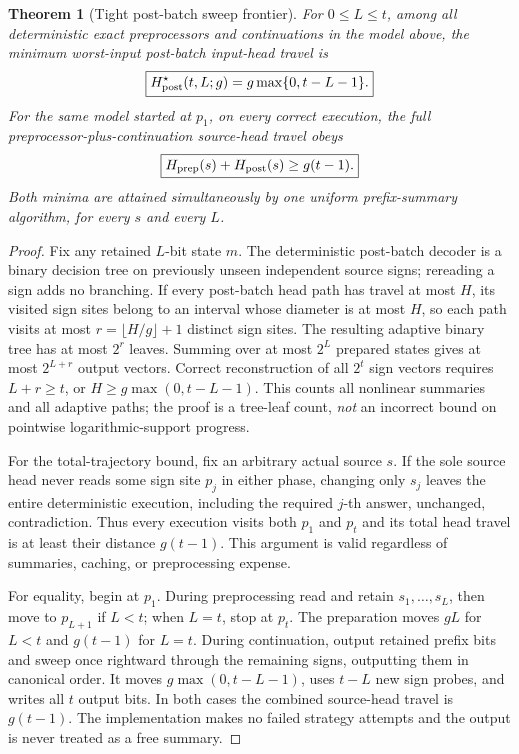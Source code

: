 \documentclass[10pt]{article}
\newtheorem{theorem}{Theorem}
\begin{document}
\begin{theorem}[Tight post-batch sweep frontier]\label{thm:sweep}
For $0\le L\le t$, among all deterministic exact preprocessors and continuations in the model above, the minimum worst-input post-batch input-head travel is
\[\boxed{H_{\rm post}^{\star}(t,L;g)=g\max\{0,t-L-1\}.}\]
For the same model started at $p_1$, on \emph{every} correct execution, the full preprocessor-plus-continuation source-head travel obeys
\[\boxed{H_{\rm prep}(s)+H_{\rm post}(s)\ge g(t-1).}\]
Both minima are attained simultaneously by one uniform prefix-summary algorithm, for every $s$ and every $L$.
\end{theorem}
\begin{proof}
Fix any retained $L$-bit state $m$. The deterministic post-batch decoder is a binary decision tree on previously unseen independent source signs; rereading a sign adds no branching. If every post-batch head path has travel at most $H$, its visited sign sites belong to an interval whose diameter is at most $H$, so each path visits at most $r=\lfloor H/g\rfloor+1$ distinct sign sites. The resulting adaptive binary tree has at most $2^r$ leaves. Summing over at most $2^L$ prepared states gives at most $2^{L+r}$ output vectors. Correct reconstruction of all $2^t$ sign vectors requires $L+r\ge t$, or $H\ge g\max(0,t-L-1)$. This counts all nonlinear summaries and all adaptive paths; the proof is a tree-leaf count, \emph{not} an incorrect bound on pointwise logarithmic-support progress.

For the total-trajectory bound, fix an arbitrary actual source $s$. If the sole source head never reads some sign site $p_j$ in either phase, changing only $s_j$ leaves the entire deterministic execution, including the required $j$-th answer, unchanged, contradiction. Thus every execution visits both $p_1$ and $p_t$ and its total head travel is at least their distance $g(t-1)$. This argument is valid regardless of summaries, caching, or preprocessing expense.

For equality, begin at $p_1$. During preprocessing read and retain $s_1,\ldots,s_L$, then move to $p_{L+1}$ if $L<t$; when $L=t$, stop at $p_t$. The preparation moves $gL$ for $L<t$ and $g(t-1)$ for $L=t$. During continuation, output retained prefix bits and sweep once rightward through the remaining signs, outputting them in canonical order. It moves $g\max(0,t-L-1)$, uses $t-L$ new sign probes, and writes all $t$ output bits. In both cases the combined source-head travel is $g(t-1)$. The implementation makes no failed strategy attempts and the output is never treated as a free summary.
\end{proof}
\end{document}
